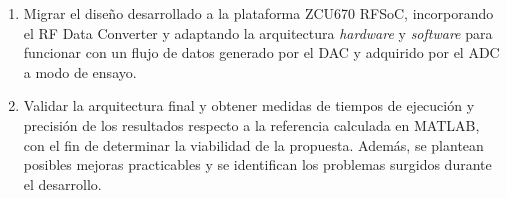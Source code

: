 \begin{enumerate}
	\item Migrar el diseño desarrollado a la plataforma ZCU670 RFSoC, incorporando el RF Data Converter y adaptando la arquitectura \textit{hardware} y \textit{software} para funcionar con un flujo de datos generado por el DAC y adquirido por el ADC a modo de ensayo.
	
	\item Validar la arquitectura final y obtener medidas de tiempos de ejecución y precisión de los resultados respecto a la referencia calculada en MATLAB, con el fin de determinar la viabilidad de la propuesta. Además, se plantean posibles mejoras practicables y se identifican los problemas surgidos durante el desarrollo.
\end{enumerate}